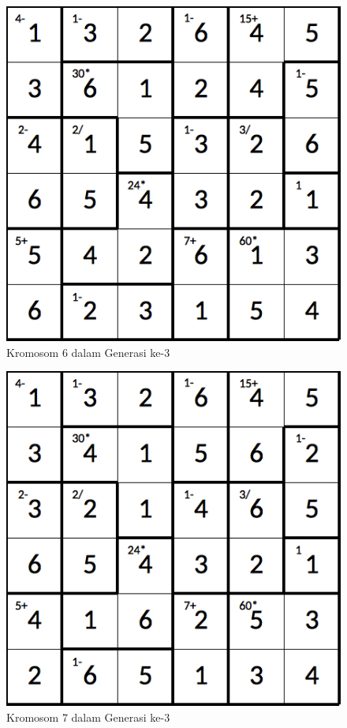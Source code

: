 \documentclass[a4paper,twoside]{article}
\begin{document}
\begin{enumerate}
\begin{figure}
\centering
\captionsetup{justification=centering}
\includegraphics[scale=0.333]{Gambar/hybridgenetic/Generation3Chromosome6}
\caption[Kromosom 6 dalam Generasi ke-3]{Kromosom 6 dalam Generasi ke-3}
\label{fig:analisisg3k6}
\end{figure}

\begin{figure}
\centering
\captionsetup{justification=centering}
\includegraphics[scale=0.333]{Gambar/hybridgenetic/Generation3Chromosome7}
\caption[Kromosom 7 dalam Generasi ke-3]{Kromosom 7 dalam Generasi ke-3}
\label{fig:analisisg3k7}
\end{figure}


\end{enumerate}
\end{document}

